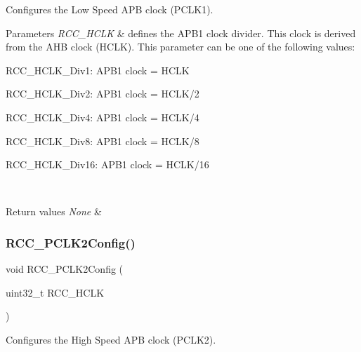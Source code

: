 Configures the Low Speed A\+PB clock (P\+C\+L\+K1). 


\begin{DoxyParams}{Parameters}
{\em R\+C\+C\+\_\+\+H\+C\+LK} & defines the A\+P\+B1 clock divider. This clock is derived from the A\+HB clock (H\+C\+LK). This parameter can be one of the following values\+: \begin{DoxyItemize}
\item R\+C\+C\+\_\+\+H\+C\+L\+K\+\_\+\+Div1\+: A\+P\+B1 clock = H\+C\+LK \item R\+C\+C\+\_\+\+H\+C\+L\+K\+\_\+\+Div2\+: A\+P\+B1 clock = H\+C\+L\+K/2 \item R\+C\+C\+\_\+\+H\+C\+L\+K\+\_\+\+Div4\+: A\+P\+B1 clock = H\+C\+L\+K/4 \item R\+C\+C\+\_\+\+H\+C\+L\+K\+\_\+\+Div8\+: A\+P\+B1 clock = H\+C\+L\+K/8 \item R\+C\+C\+\_\+\+H\+C\+L\+K\+\_\+\+Div16\+: A\+P\+B1 clock = H\+C\+L\+K/16 \end{DoxyItemize}
\\
\hline
\end{DoxyParams}

\begin{DoxyRetVals}{Return values}
{\em None} & \\
\hline
\end{DoxyRetVals}
\mbox{\label{group___r_c_c___group2_ga09f9c010a4adca9e036da42c2ca6126a}} 
\subsubsection{\texorpdfstring{R\+C\+C\+\_\+\+P\+C\+L\+K2\+Config()}{RCC\_PCLK2Config()}}
{\footnotesize\ttfamily void R\+C\+C\+\_\+\+P\+C\+L\+K2\+Config (\begin{DoxyParamCaption}\item[{uint32\+\_\+t}]{R\+C\+C\+\_\+\+H\+C\+LK }\end{DoxyParamCaption})}



Configures the High Speed A\+PB clock (P\+C\+L\+K2). 


